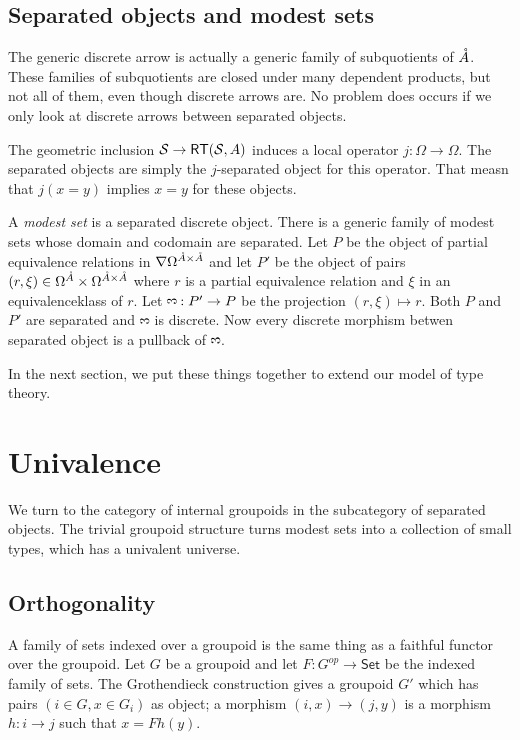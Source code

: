 \documentclass{amsart}
\theoremstyle{plain}
\theoremstyle{definition}
\newcommand\cat\mathcal
\begin{document}
\newcommand\genmod{\mathrm{\rotatebox[origin=c]{90}{3}}}
\subsection{Separated objects and modest sets}
The generic discrete arrow is actually a generic family of subquotients of ${\mathring A}$. These families of subquotients are closed under many dependent products, but not all of them, even though discrete arrows are. No problem does occurs if we only look at discrete arrows between separated objects.

The geometric inclusion $\cat S\to\rt(\cat S,A)$ induces a local operator $j:\Omega \to \Omega$. The separated objects are simply the $j$-separated object for this operator. That measn that $j(x=y)$ implies $x=y$ for these objects.

A \emph{modest set} is a separated discrete object. There is a generic family of modest sets whose domain and codomain are separated. Let $P$ be the object of partial equivalence relations in $\nabla \Omega^{{\mathring A}\times {\mathring A}}$ and let $P'$ be the object of pairs $(r,\xi)\in \Omega^{\mathring A}\times\Omega^{{\mathring A}\times{\mathring A}}$ where $r$ is a partial equivalence relation and $\xi$ in an equivalenceklass of $r$. Let $\genmod:P'\to P$ be the projection $(r,\xi)\mapsto r$. Both $P$ and $P'$ are separated and $\genmod$ is discrete. Now every discrete morphism betwen separated object is a pullback of $\genmod$.


In the next section, we put these things together to extend our model of type theory.

\section{Univalence}
We turn to the category of internal groupoids in the subcategory of separated objects. The trivial groupoid structure turns modest sets into a collection of small types, which has a univalent universe.

\subsection{Orthogonality}
A family of sets indexed over a groupoid is the same thing as a faithful functor over the groupoid. Let $G$ be a groupoid and let $F:G^{op}\to\mathsf{Set}$ be the indexed family of sets. The Grothendieck construction gives a groupoid $G'$ which has pairs $(i\in G,x\in G_i)$ as object; a morphism $(i,x)\to (j,y)$ is a morphism $h:i\to j$ such that $x=Fh(y)$.
\end{document}

